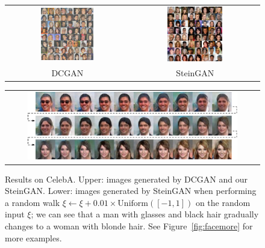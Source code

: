 \begin{figure}[t]
\centering
\begin{tabular}{cc}
\includegraphics[width=0.45\textwidth]{figures/faces/dcgan_bright.pdf} & 
\includegraphics[width=0.45\textwidth]{figures/faces/vgd_faces_small.pdf} \\
DCGAN & SteinGAN \\
\end{tabular}
\begin{tabular}{c}
\includegraphics[width=0.85\textwidth]{figures/faces/z2.pdf} \\
\end{tabular}
\caption{Results on CelebA. Upper: images generated by DCGAN and our SteinGAN. Lower: images generated by SteinGAN when performing a random walk $\xi\gets \xi + 0.01\times\mathrm{Uniform}([-1,1])$ on the random input $\xi$; we can see that a man with glasses and black hair gradually changes to a woman with blonde hair. 
See Figure~\ref{fig:facemore} for more examples. }
\label{fig:face}
\end{figure}


